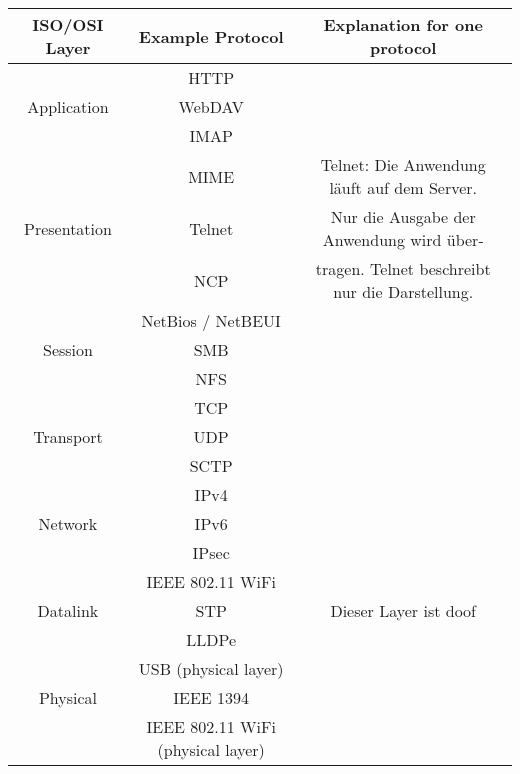 \documentclass[a4paper,
			llpt,
			solution,
			accentcolor=tud2d,
			colorbacktitle
			]
			{tudexercise}
\begin{document}
\begin{center}
\begin{tabular}{|c|c|c|}
\hline
ISO/OSI Layer
&
Example Protocol
&
Explanation for one protocol
\\
\hline
&HTTP&
\\ \cline {2-2}
Application & WebDAV &
\\ \cline {2-2}
&IMAP&
\\ \hline
&MIME& Telnet: Die Anwendung läuft auf dem Server.
\\ \cline {2-2}
Presentation &Telnet&Nur die Ausgabe der Anwendung wird über-
\\ \cline {2-2}
&NCP&tragen. Telnet beschreibt nur die Darstellung.
\\ \hline
&NetBios / NetBEUI&
\\ \cline {2-2}
Session & SMB &
\\ \cline {2-2}
& NFS &
\\ \hline
&TCP&
\\ \cline {2-2}
Transport &UDP&
\\ \cline {2-2}
&SCTP&
\\ \hline
&IPv4&
\\ \cline {2-2}
Network &IPv6&
\\ \cline {2-2}
&IPsec&
\\ \hline
&IEEE 802.11 WiFi&
\\ \cline {2-2}
Datalink &STP& Dieser Layer ist doof
\\ \cline {2-2}
&LLDPe&
\\ \hline
&USB (physical layer)&
\\ \cline {2-2}
Physical &IEEE 1394&
\\ \cline {2-2}
&IEEE 802.11 WiFi (physical layer)&
\\ \hline
\end{tabular}
\end{center}
\end{document}
